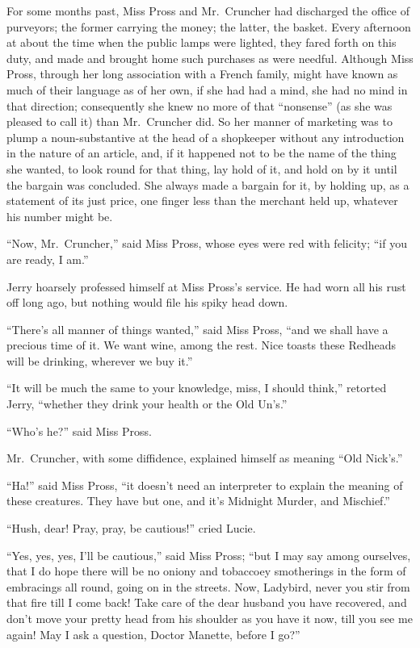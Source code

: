 For some months past, Miss Pross and Mr.\ Cruncher had discharged the
office of purveyors; the former carrying the money; the latter, the
basket.  Every afternoon at about the time when the public lamps were
lighted, they fared forth on this duty, and made and brought home
such purchases as were needful.  Although Miss Pross, through her
long association with a French family, might have known as much of
their language as of her own, if she had had a mind, she had no mind
in that direction; consequently she knew no more of that ``nonsense''
(as she was pleased to call it) than Mr.\ Cruncher did.  So her
manner of marketing was to plump a noun-substantive at the head of a
shopkeeper without any introduction in the nature of an article, and,
if it happened not to be the name of the thing she wanted, to look
round for that thing, lay hold of it, and hold on by it until the
bargain was concluded.  She always made a bargain for it, by holding
up, as a statement of its just price, one finger less than the merchant
held up, whatever his number might be.

``Now, Mr.\ Cruncher,'' said Miss Pross, whose eyes were red with
felicity; ``if you are ready, I am.''

Jerry hoarsely professed himself at Miss Pross's service.  He had worn
all his rust off long ago, but nothing would file his spiky head down.

``There's all manner of things wanted,'' said Miss Pross, ``and we shall
have a precious time of it.  We want wine, among the rest.
Nice toasts these Redheads will be drinking, wherever we buy it.''

``It will be much the same to your knowledge, miss, I should think,''
retorted Jerry, ``whether they drink your health or the Old Un's.''

``Who's he?'' said Miss Pross.

Mr.\ Cruncher, with some diffidence, explained himself as meaning ``Old
Nick's.''

``Ha!'' said Miss Pross, ``it doesn't need an interpreter to explain the
meaning of these creatures.  They have but one, and it's Midnight
Murder, and Mischief.''

``Hush, dear!  Pray, pray, be cautious!'' cried Lucie.

``Yes, yes, yes, I'll be cautious,'' said Miss Pross; ``but I may say
among ourselves, that I do hope there will be no oniony and tobaccoey
smotherings in the form of embracings all round, going on in the
streets.  Now, Ladybird, never you stir from that fire till I come
back!  Take care of the dear husband you have recovered, and don't
move your pretty head from his shoulder as you have it now, till you
see me again!  May I ask a question, Doctor Manette, before I go?''

